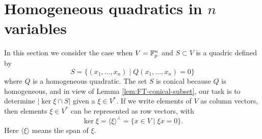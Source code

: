 \section{Homogeneous quadratics in $n$ variables}\label{sec:part1}
In this section we consider the case when $V = \mathbb{F}_p^n$ and $S \subset V$ is a quadric defined by
\[
	S = \{(x_1,\ldots,x_n) \mid Q(x_1,\ldots,x_n) = 0\}
\]
where $Q$ is a homogeneous quadratic. The set $S$ is conical because $Q$ is homogeneous, and in view of Lemma \ref{lem:FT-conical-subset}, our task is to determine $|\ker \xi \cap S|$ given a $\xi \in V^*$. If we write elements of $V$ as column vectors, then elements $\xi \in V^*$ can be represented as row vectors, with
\[
	\ker \xi = \langle \xi \rangle^\bot = \{x \in V \mid \xi x =0\}.
\]
Here $\langle \xi \rangle$ means the span of $\xi$.

